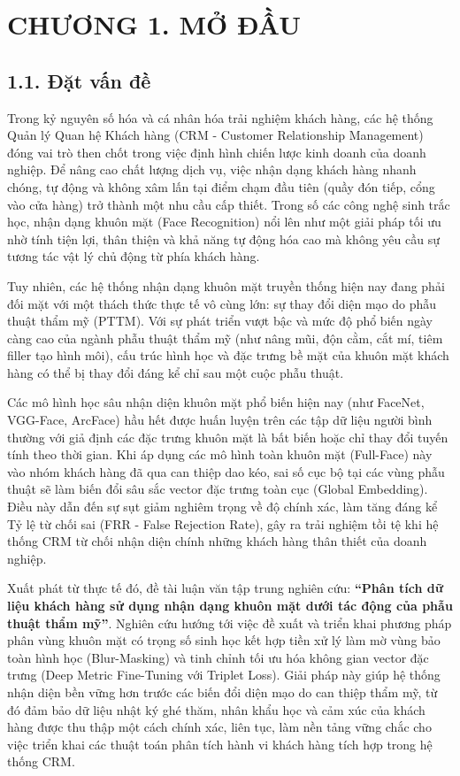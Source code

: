\section*{CHƯƠNG 1. MỞ ĐẦU}
\setcounter{section}{1}
\setcounter{subsection}{0}
\setcounter{figure}{0}
\setcounter{table}{0}
\subsection*{1.1. Đặt vấn đề}

Trong kỷ nguyên số hóa và cá nhân hóa trải nghiệm khách hàng, các hệ thống Quản lý Quan hệ Khách hàng (CRM - Customer Relationship Management) đóng vai trò then chốt trong việc định hình chiến lược kinh doanh của doanh nghiệp. Để nâng cao chất lượng dịch vụ, việc nhận dạng khách hàng nhanh chóng, tự động và không xâm lấn tại điểm chạm đầu tiên (quầy đón tiếp, cổng vào cửa hàng) trở thành một nhu cầu cấp thiết. Trong số các công nghệ sinh trắc học, nhận dạng khuôn mặt (Face Recognition) nổi lên như một giải pháp tối ưu nhờ tính tiện lợi, thân thiện và khả năng tự động hóa cao mà không yêu cầu sự tương tác vật lý chủ động từ phía khách hàng.

Tuy nhiên, các hệ thống nhận dạng khuôn mặt truyền thống hiện nay đang phải đối mặt với một thách thức thực tế vô cùng lớn: sự thay đổi diện mạo do phẫu thuật thẩm mỹ (PTTM). Với sự phát triển vượt bậc và mức độ phổ biến ngày càng cao của ngành phẫu thuật thẩm mỹ (như nâng mũi, độn cằm, cắt mí, tiêm filler tạo hình môi), cấu trúc hình học và đặc trưng bề mặt của khuôn mặt khách hàng có thể bị thay đổi đáng kể chỉ sau một cuộc phẫu thuật. 

Các mô hình học sâu nhận diện khuôn mặt phổ biến hiện nay (như FaceNet, VGG-Face, ArcFace) hầu hết được huấn luyện trên các tập dữ liệu người bình thường với giả định các đặc trưng khuôn mặt là bất biến hoặc chỉ thay đổi tuyến tính theo thời gian. Khi áp dụng các mô hình toàn khuôn mặt (Full-Face) này vào nhóm khách hàng đã qua can thiệp dao kéo, sai số cục bộ tại các vùng phẫu thuật sẽ làm biến đổi sâu sắc vector đặc trưng toàn cục (Global Embedding). Điều này dẫn đến sự sụt giảm nghiêm trọng về độ chính xác, làm tăng đáng kể Tỷ lệ từ chối sai (FRR - False Rejection Rate), gây ra trải nghiệm tồi tệ khi hệ thống CRM từ chối nhận diện chính những khách hàng thân thiết của doanh nghiệp.

Xuất phát từ thực tế đó, đề tài luận văn tập trung nghiên cứu: \textbf{``Phân tích dữ liệu khách hàng sử dụng nhận dạng khuôn mặt dưới tác động của phẫu thuật thẩm mỹ''}. Nghiên cứu hướng tới việc đề xuất và triển khai phương pháp phân vùng khuôn mặt có trọng số sinh học kết hợp tiền xử lý làm mờ vùng bảo toàn hình học (Blur-Masking) và tinh chỉnh tối ưu hóa không gian vector đặc trưng (Deep Metric Fine-Tuning với Triplet Loss). Giải pháp này giúp hệ thống nhận diện bền vững hơn trước các biến đổi diện mạo do can thiệp thẩm mỹ, từ đó đảm bảo dữ liệu nhật ký ghé thăm, nhân khẩu học và cảm xúc của khách hàng được thu thập một cách chính xác, liên tục, làm nền tảng vững chắc cho việc triển khai các thuật toán phân tích hành vi khách hàng tích hợp trong hệ thống CRM.

